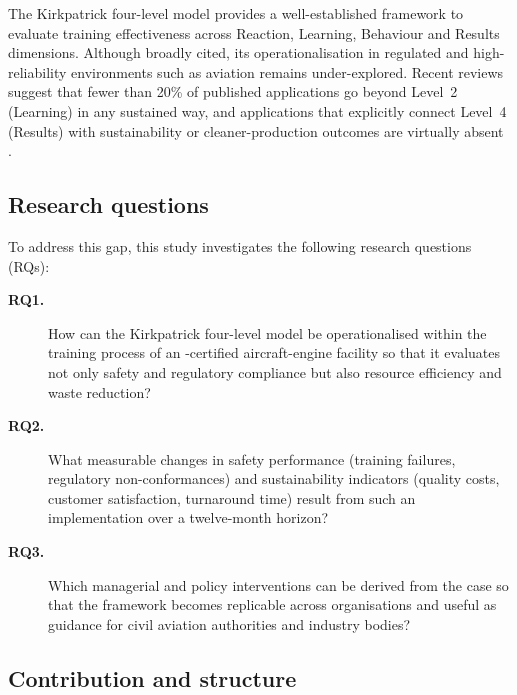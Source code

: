 The Kirkpatrick four-level model
\citep{Kirkpatrick2010,Patel2023,Fernandez2024} provides a well-established
framework to evaluate training effectiveness across Reaction, Learning,
Behaviour and Results dimensions. Although broadly cited, its
operationalisation in regulated and high-reliability environments such as
aviation \MRO{} remains under-explored. Recent reviews suggest that fewer than
20\% of published applications go beyond Level~2 (Learning) in any sustained
way, and applications that explicitly connect Level~4 (Results) with
sustainability or cleaner-production outcomes are virtually absent
\citep{ORreilly2024,Peterson2025}.

\subsection{Research questions}
\label{subsec:rqs}

To address this gap, this study investigates the following research
questions (RQs):

\begin{description}
  \item[\textbf{RQ1.}] How can the Kirkpatrick four-level model be
        operationalised within the training process of an \AS{}-certified
        aircraft-engine \MRO{} facility so that it evaluates not only safety
        and regulatory compliance but also resource efficiency and waste
        reduction?
  \item[\textbf{RQ2.}] What measurable changes in safety performance
        (training failures, regulatory non-conformances) and sustainability
        indicators (quality costs, customer satisfaction, turnaround time)
        result from such an implementation over a twelve-month horizon?
  \item[\textbf{RQ3.}] Which managerial and policy interventions can be
        derived from the case so that the framework becomes replicable across
        \MRO{} organisations and useful as guidance for civil aviation
        authorities and industry bodies?
\end{description}

\subsection{Contribution and structure}
\label{subsec:contribution}

